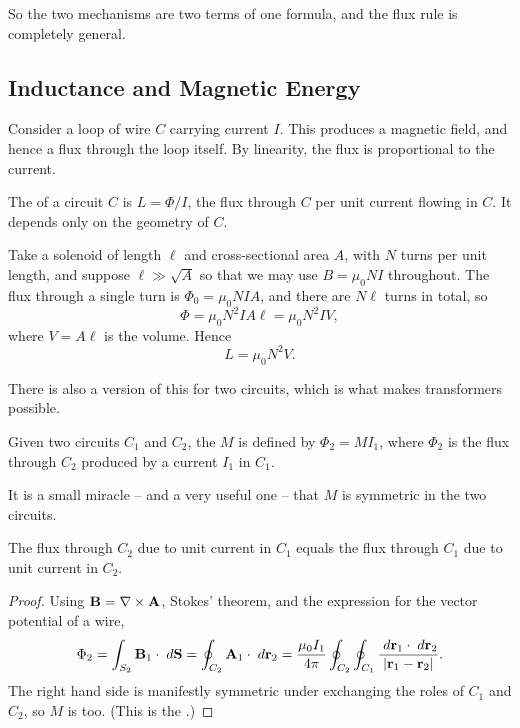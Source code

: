 \documentclass[a4paper]{scrartcl}
\begin{document}
So the two mechanisms are two terms of one formula, and the flux rule is completely general.

\subsection{Inductance and Magnetic Energy}

Consider a loop of wire $C$ carrying current $I$. This produces a magnetic field, and hence a flux through the loop itself. By linearity, the flux is proportional to the current.

\begin{definition}[Inductance]
	The  of a circuit $C$ is $L = \Phi/I$, the flux through $C$ per unit current flowing in $C$. It depends only on the geometry of $C$.
\end{definition}

\begin{example}
	Take a solenoid of length $\ell$ and cross-sectional area $A$, with $N$ turns per unit length, and suppose $\ell \gg \sqrt{A}$ so that we may use $B = \mu_0 N I$ throughout. The flux through a single turn is $\Phi_0 = \mu_0 N I A$, and there are $N\ell$ turns in total, so
	$$
	\Phi = \mu_0 N^2 I A \ell = \mu_0 N^2 I V,
	$$
	where $V = A\ell$ is the volume. Hence
	$$
	L = \mu_0 N^2 V.
	$$
\end{example}

There is also a version of this for two circuits, which is what makes transformers possible.

\begin{definition}
	Given two circuits $C_1$ and $C_2$, the  $M$ is defined by $\Phi_2 = M I_1$, where $\Phi_2$ is the flux through $C_2$ produced by a current $I_1$ in $C_1$.
\end{definition}

It is a small miracle -- and a very useful one -- that $M$ is symmetric in the two circuits.

\begin{proposition}
	The flux through $C_2$ due to unit current in $C_1$ equals the flux through $C_1$ due to unit current in $C_2$.
\end{proposition}
\begin{proof}
	Using $\mathbf{B} = \nabla\times\mathbf{A}$, Stokes' theorem, and the expression for the vector potential of a wire,
	$$
	\Phi_2 = \int_{S_2}\mathbf{B}_1\cdot\; d\mathbf{S} = \oint_{C_2}\mathbf{A}_1\cdot \; d\mathbf{r}_2 = \frac{\mu_0 I_1}{4\pi}\oint_{C_2}\oint_{C_1}\frac{\; d \mathbf{r}_1\cdot \; d\mathbf{r}_2}{|\mathbf{r}_1-\mathbf{r}_2|}.
	$$
	The right hand side is manifestly symmetric under exchanging the roles of $C_1$ and $C_2$, so $M$ is too. (This is the .)
\end{proof}
\end{document}
